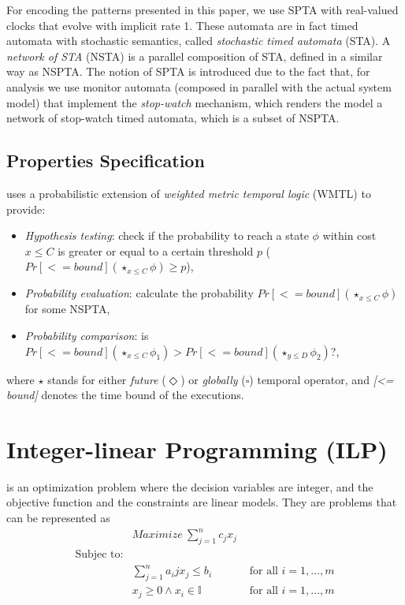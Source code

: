 For encoding the patterns presented in this paper, we use SPTA with real-valued clocks that evolve with implicit rate 1. These automata are in fact timed automata with stochastic semantics, called \textit{stochastic timed automata} (STA). A \textit{network of STA} (NSTA) is a parallel composition of STA, defined in a similar way as NSPTA. The notion of SPTA is introduced due to the fact that, for analysis we use monitor automata (composed in parallel with the actual system model) that implement the \emph{stop-watch} mechanism, which renders the model a network of stop-watch timed automata, which is a subset of NSPTA.

\subsection*{Properties Specification}
\uppaalsmc{} uses a probabilistic extension of \textit{weighted metric temporal logic} (WMTL) \cite{bulychev2012rewrite} to provide:
\begin{itemize}
	\item \textit{Hypothesis testing}: check if the probability to reach a state $\phi$ within cost $x\leq C$ is greater or equal to a certain threshold $p$ ($Pr[<= bound](\star_{x\leq C}\phi) \geq p$),
	\item \textit{Probability evaluation}: calculate the probability $Pr[<= bound](\star_{x\leq C}\phi)$ for some NSPTA,
	\item \textit{Probability comparison}: is $Pr[<= bound](\star_{x\leq C}\phi_1) > Pr[<= bound](\star_{y\leq D}\phi_2)$?,
\end{itemize}
where $\star$ stands for either \textit{future} ($\Diamond$) or \textit{globally} ($\square$) temporal operator, and \textit{[<= bound]} denotes the time bound of the executions.
\section{Integer-linear Programming (ILP)}
\ilp{} is an optimization problem where the decision variables are integer, and the objective function and the constraints are linear models.  They are problems that can be represented as 
\begin{align}
	&Maximize\ \sum_{j=1}^{n}{c_jx_j}\\
	\mbox{Subjec to:}&\\
	&\sum_{j=1}^n{a_ijx_j}\leq b_i&\mbox{ for all } i=1,...,m\\
	&x_j\geq 0 \land x_i\in \mathbb{I} &\mbox{ for all } i=1,...,m
\end{align}

